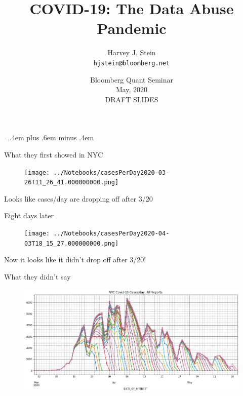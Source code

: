 \documentclass[aspectratio=169]{beamer}
\title{COVID-19: The Data Abuse Pandemic}
\author[Harvey J. Stein]{Harvey J. Stein\\\texttt{hjstein@bloomberg.net}}
\institute[Bloomberg LP]
{
  Head, Quantitative Risk Analytics\\
  Bloomberg L.P.
}
\date{Bloomberg Quant Seminar\\
  May, 2020\\
  DRAFT SLIDES}
\begin{document}
\nocite{nyc2020data,Stein2020nycdata,Stein2020owiddata,owid2020data}
\nocite{Stein2020Seem,Stein2020Ray,owid2020data,JHU2020data}
\nocite{NYT2020data}

\parskip=.4em plus .6em minus .4em

\begin{frame}

  \titlepage


\end{frame}

\begin{frame}{What they first showed in NYC}
  \begin{figure}
    \centering
    \texttt{[image: ../Notebooks/casesPerDay2020-03-26T11\_26\_41.000000000.png]}
  \end{figure}
  Looks like cases/day are dropping off after 3/20
\end{frame}

\begin{frame}{Eight days later}
  \begin{figure}
    \centering
    \texttt{[image: ../Notebooks/casesPerDay2020-04-03T18\_15\_27.000000000.png]}
  \end{figure}
  Now it looks like it \alert{didn't} drop off after 3/20!
\end{frame}

\begin{frame}{What they didn't say}
  \begin{figure}
    \centering
    \includegraphics[width=1\textwidth]{../Notebooks/theFullStory.png}
  \end{figure}
\end{frame}
\end{document}
